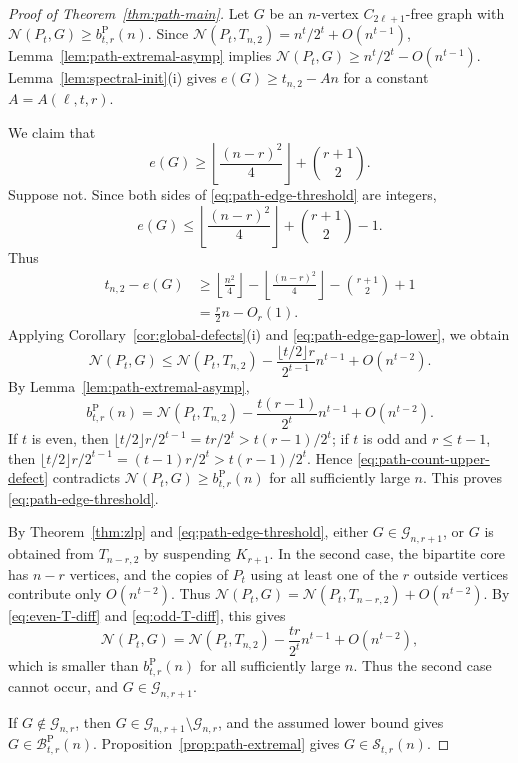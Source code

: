\documentclass[11pt]{article}
\theoremstyle{definition}
\theoremstyle{plain}
\theoremstyle{remark}
\theoremstyle{plain}
\numberwithin{equation}{section}
\newcommand{\cG}{\mathcal G}
\newcommand{\cB}{\mathcal B}
\newcommand{\cS}{\mathcal S}
\newcommand{\N}{\mathcal N}
\begin{document}
\begin{proof}[Proof of Theorem~\ref{thm:path-main}]
Let $G$ be an $n$-vertex $C_{2\ell+1}$-free graph with $\N(P_t,G)\ge b^{\mathrm P}_{t,r}(n)$. Since $\N(P_t,T_{n,2})=n^t/2^t+O(n^{t-1})$, Lemma~\ref{lem:path-extremal-asymp} implies $\N(P_t,G)\ge n^t/2^t-O(n^{t-1})$. Lemma~\ref{lem:spectral-init}(i) gives $e(G)\ge t_{n,2}-An$ for a constant $A=A(\ell,t,r)$.

We claim that
\begin{equation}\label{eq:path-edge-threshold}
        e(G)\ge \left\lfloor\frac{(n-r)^2}{4}\right\rfloor+\binom{r+1}{2}.
\end{equation}
Suppose not. Since both sides of \eqref{eq:path-edge-threshold} are integers,
\[
        e(G)\le \left\lfloor\frac{(n-r)^2}{4}\right\rfloor+\binom{r+1}{2}-1.
\]
Thus
\begin{equation}\label{eq:path-edge-gap-lower}
\begin{aligned}
        t_{n,2}-e(G)
        &\ge \left\lfloor\frac{n^2}{4}\right\rfloor
        -\left\lfloor\frac{(n-r)^2}{4}\right\rfloor
        -\binom{r+1}{2}+1\\
        &=\frac r2 n-O_r(1).
\end{aligned}
\end{equation}
Applying Corollary~\ref{cor:global-defects}(i) and \eqref{eq:path-edge-gap-lower}, we obtain
\begin{equation}\label{eq:path-count-upper-defect}
        \N(P_t,G)\le \N(P_t,T_{n,2})-
        \frac{\lfloor t/2\rfloor r}{2^{t-1}}n^{t-1}+O(n^{t-2}).
\end{equation}
By Lemma~\ref{lem:path-extremal-asymp},
\[
        b^{\mathrm P}_{t,r}(n)=\N(P_t,T_{n,2})-\frac{t(r-1)}{2^t}n^{t-1}+O(n^{t-2}).
\]
If $t$ is even, then $\lfloor t/2\rfloor r/2^{t-1}=tr/2^t>t(r-1)/2^t$; if $t$ is odd and $r\le t-1$, then $\lfloor t/2\rfloor r/2^{t-1}=(t-1)r/2^t>t(r-1)/2^t$. Hence \eqref{eq:path-count-upper-defect} contradicts $\N(P_t,G)\ge b^{\mathrm P}_{t,r}(n)$ for all sufficiently large $n$. This proves \eqref{eq:path-edge-threshold}.

By Theorem~\ref{thm:zlp} and \eqref{eq:path-edge-threshold}, either $G\in\cG_{n,r+1}$, or $G$ is obtained from $T_{n-r,2}$ by suspending $K_{r+1}$. In the second case, the bipartite core has $n-r$ vertices, and the copies of $P_t$ using at least one of the $r$ outside vertices contribute only $O(n^{t-2})$. Thus $\N(P_t,G)=\N(P_t,T_{n-r,2})+O(n^{t-2})$. By \eqref{eq:even-T-diff} and \eqref{eq:odd-T-diff}, this gives
\[
        \N(P_t,G)=\N(P_t,T_{n,2})-\frac{tr}{2^t}n^{t-1}+O(n^{t-2}),
\]
which is smaller than $b^{\mathrm P}_{t,r}(n)$ for all sufficiently large $n$. Thus the second case cannot occur, and $G\in\cG_{n,r+1}$.

If $G\notin\cG_{n,r}$, then $G\in\cG_{n,r+1}\setminus\cG_{n,r}$, and the assumed lower bound gives $G\in\cB^{\mathrm P}_{t,r}(n)$. Proposition~\ref{prop:path-extremal} gives $G\in\cS_{t,r}(n)$.
\end{proof}
\end{document}
